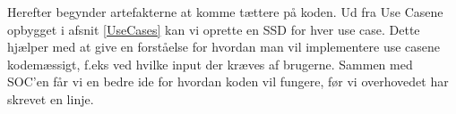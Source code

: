 Herefter begynder artefakterne at komme tættere på koden. Ud fra Use Casene opbygget i afsnit \ref{UseCases} kan vi oprette en SSD for hver use case. Dette hjælper med at give en forståelse for hvordan man vil implementere use casene kodemæssigt, f.eks ved hvilke input der kræves af brugerne. Sammen med SOC'en får vi en bedre ide for hvordan koden vil fungere, før vi overhovedet har skrevet en linje.